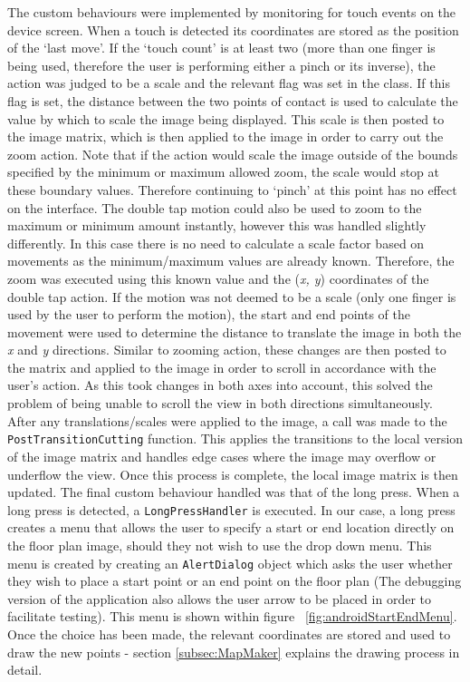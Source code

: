 \documentclass[12pt,a4paper]{report}
\begin{document}
                The custom behaviours were implemented by monitoring for touch events on the device
                screen. When a touch is detected its coordinates are stored as the position of the `last move'.
                If the `touch count' is at least two (more than one finger is being used, therefore the user is performing either
                a pinch or its inverse), the action was judged to be a scale and the relevant flag was set in the class. If this flag is set, the distance between the two points of contact
                is used to calculate the value by which to scale the image being displayed. This scale is then posted to the image matrix, which is then applied to the image in
                order to carry out the zoom action. Note that if the action would scale the image outside of the bounds specified by the minimum or maximum allowed zoom,
                the scale would stop at these boundary values. Therefore continuing to `pinch' at this point has no effect on the interface. The double tap motion could also be
                used to zoom to the maximum or minimum amount instantly, however this was handled slightly differently. In this case there is no need to calculate a scale
                factor based on movements as the minimum/maximum values are already known. Therefore, the zoom was executed using this known value and the
                (\textit{x, y}) coordinates of the double tap action.
                If the motion was not deemed to be a scale (only one finger is used by the user to perform the motion), the start and end points
                of the movement were used to determine the distance to translate the image in both the \textit{x} and \textit{y} directions. Similar to zooming action, these changes are
                then posted to the matrix and applied to the image in order to scroll in accordance with the user's action. As this took changes in both axes into account, this
                solved the problem of being unable to scroll the view in both directions simultaneously. After any translations/scales were applied to the image, a call was made to
                the \texttt{PostTransitionCutting} function. This applies the transitions to the local version of the image matrix and handles edge cases where the image may overflow
                or underflow the view. Once this process is complete, the local image matrix is then updated. The final custom behaviour handled was that of the long press. When a 
                long press is detected, a \texttt{LongPressHandler} is executed. In our case, a long press creates a menu that allows the user to specify a start or end location
                directly on the floor plan image, should they not wish to use the drop down menu. This menu is created by creating an \texttt{AlertDialog} object which asks the
                user whether they wish to place a start point or an end point on the floor plan (The debugging version of the application also allows the user arrow to be placed
                in order to facilitate testing). This menu is shown within figure ~\ref{fig:androidStartEndMenu}. Once the choice has been made, the relevant coordinates are stored and used to draw the new points - section \ref{subsec:MapMaker}
                explains the drawing process in detail.
\end{document}
